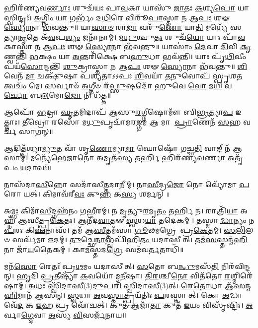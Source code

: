 𑌹𑌿𑌰᳴𑌣𑍍𑌯𑌵\-\ul{𑌰𑍍𑌣𑌾𑌃} 𑌶𑍁𑌚᳴𑌯𑌃 𑌪𑌾\-\ul{𑌵}\-𑌕𑌾 𑌯𑌾𑌸𑍁᳴ \ul{𑌜𑌾}\-𑌤𑌃 \ul{𑌕}\-𑌶𑍍𑌯\-\ul{𑌪𑍋} 𑌯𑌾𑌸𑍍𑌵𑌿𑌨𑍍𑌦𑍍𑌰𑌃᳴।
\-\ul{𑌅}\-𑌗𑍍𑌨𑌿𑌂 𑌯𑌾 𑌗𑌰𑍍𑌭𑌂᳴ 𑌦\-\ul{𑌧𑌿}\-𑌰𑍇 𑌵𑌿𑌰𑍂᳴\-\ul{𑌪𑌾}\-𑌸𑍍𑌤𑌾 \ul{𑌨} 𑌆\-\ul{𑌪𑌃} 𑌶𑍟 \ul{𑌸𑍍𑌯𑍋}\-𑌨𑌾 𑌭᳴𑌵𑌨𑍍𑌤𑍁॥ 
𑌯𑌾\-\ul{𑌸𑌾}\-\-\ul{𑍞} 𑌰𑌾\-\ul{𑌜𑌾} 𑌵𑌰𑍁᳴\-\ul{𑌣𑍋} 𑌯𑌾\-\ul{𑌤𑌿} 𑌮𑌧𑍍𑌯𑍇᳴ 𑌸𑌤𑍍𑌯𑌾\-\ul{𑌨𑍃}\-𑌤𑍇 𑌅᳴\-\ul{𑌵}\-𑌪\-\ul{𑌶𑍍𑌯𑌂} 𑌜𑌨𑌾᳴𑌨𑌾𑌮𑍍।
\-\ul{𑌮}\-\-\ul{𑌧𑍁}\-𑌶𑍍𑌚𑍁\-\ul{𑌤𑌃} 𑌶𑍁𑌚᳴\-\ul{𑌯𑍋} 𑌯𑌾𑌃 𑌪𑌾᳴\-\ul{𑌵}\-𑌕𑌾𑌸𑍍𑌤𑌾 \ul{𑌨} 𑌆\-\ul{𑌪𑌃} 𑌶𑍟 \ul{𑌸𑍍𑌯𑍋}\-𑌨𑌾 𑌭᳴𑌵𑌨𑍍𑌤𑍁॥ 
𑌯𑌾𑌸𑌾𑌂॑ \ul{𑌦𑍇}\-𑌵𑌾 \ul{𑌦𑌿}\-𑌵𑌿 \ul{𑌕𑍃}\-𑌣𑍍𑌵𑌨𑍍𑌤𑌿᳴ \ul{𑌭}\-𑌕𑍍𑌷𑌂 𑌯𑌾 \ul{𑌅}\-𑌨𑍍𑌤𑌰𑌿᳴𑌕𑍍𑌷𑍇 𑌬\-\ul{𑌹𑍁}\-𑌧𑌾 𑌭𑌵᳴𑌨𑍍𑌤𑌿।
𑌯𑌾𑌃 𑌪𑍃᳴\-\ul{𑌥𑌿}\-𑌵𑍀𑌂 𑌪𑌯᳴\-\ul{𑌸𑍋}\-𑌨𑍍𑌦𑌨𑍍𑌤𑌿᳴ \ul{𑌶𑍁}\-𑌕𑍍𑌰𑌾𑌸𑍍𑌤𑌾 \ul{𑌨} 𑌆\-\ul{𑌪𑌃} 𑌶𑍟 \ul{𑌸𑍍𑌯𑍋}\-𑌨𑌾 𑌭᳴𑌵𑌨𑍍𑌤𑍁॥ 
\-\ul{𑌶𑌿}\-𑌵𑍇𑌨᳴ \ul{𑌮𑌾} 𑌚𑌕𑍍𑌷𑍁᳴𑌷𑌾 𑌪𑌶𑍍𑌯𑌤𑌾𑌽𑌽𑌪𑌃 \ul{𑌶𑌿}\-𑌵𑌯𑌾᳴ \ul{𑌤}\-𑌨𑍁𑌵𑍋𑌪᳴ 𑌸𑍍𑌪𑍃𑌶\-\ul{𑌤} 𑌤𑍍𑌵𑌚𑌂᳴ 𑌮𑍇।
𑌸𑌰𑍍𑌵𑌾𑍞᳴ \ul{𑌅}\-𑌗𑍍𑌨𑍀𑍞 𑌰᳴\-\ul{𑌫𑍍𑌸𑍁}\-𑌷𑌦𑍋᳴ 𑌹𑍁𑌵𑍇 \ul{𑌵𑍋} 𑌮\-\ul{𑌯𑌿} 𑌵\-\ul{𑌰𑍍𑌚𑍋} 𑌬\-\ul{𑌲}\-𑌮𑍋\-\ul{𑌜𑍋} 𑌨𑌿 𑌧᳴𑌤𑍍𑌤॥

𑌆𑌪𑍋᳴ \ul{𑌭}\-𑌦𑍍𑌰𑌾 \ul{𑌘𑍃}\-𑌤𑌮𑌿𑌦𑌾𑌪᳴ 𑌆𑌸𑍁\-\ul{𑌰}\-𑌗𑍍𑌨𑍀𑌷𑍋𑌮𑍗᳴ 𑌬𑌿\-\ul{𑌭𑍍𑌰}\-𑌤𑍍𑌯𑌾\-\ul{𑌪} 𑌇𑌤𑍍𑌤𑌾𑌃।
\-\ul{𑌤𑍀}\-𑌵𑍍𑌰𑍋 𑌰𑌸𑍋᳴ 𑌮\-\ul{𑌧𑍁}\-𑌪𑍃𑌚𑌾᳴𑌮𑌰\-\ul{𑌙𑍍𑌗}\-𑌮 𑌆 𑌮𑌾 \ul{𑌪𑍍𑌰𑌾}\-𑌣𑍇𑌨᳴ \ul{𑌸}\-𑌹 𑌵𑌰𑍍𑌚᳴ 𑌸𑌾𑌗𑌨𑍍॥

𑌆𑌦𑌿𑌤𑍍𑌪᳴𑌶𑍍𑌯𑌾\-\ul{𑌮𑍍𑌯𑍁}\-𑌤 𑌵𑌾᳴ 𑌶𑍃\-\ul{𑌣𑍋}\-𑌮𑍍𑌯𑌾\-\ul{𑌮𑌾} 𑌘𑍋𑌷𑍋᳴ 𑌗𑌚𑍍𑌛\-\ul{𑌤𑌿} 𑌵𑌾𑌙𑍍 𑌨᳴ 𑌆𑌸𑌾𑌮𑍍।
𑌮𑌨𑍍𑌯𑍇᳴𑌭𑍇\-\ul{𑌜𑌾}\-𑌨𑍋 \ul{𑌅}\-𑌮𑍃𑌤᳴\-\ul{𑌸𑍍𑌯} 𑌤𑌰𑍍\mbox{}\-\ul{𑌹𑌿} 𑌹𑌿𑌰᳴𑌣𑍍𑌯𑌵\-\ul{𑌰𑍍𑌣𑌾} 𑌅𑌤𑍃᳴𑌪𑌂 \ul{𑌯}\-𑌦𑌾𑌵𑌃᳴॥


𑌨𑌾𑌸᳴𑌦𑌾\-\ul{𑌸𑍀}\-𑌨𑍍𑌨𑍋 𑌸𑌦𑌾᳴𑌸𑍀\-\ul{𑌤𑍍𑌤}\-𑌦𑌾𑌨𑍀𑌮𑍍।
𑌨𑌾\-\ul{𑌸𑍀}\-𑌦𑍍𑌰\-\ul{𑌜𑍋} 𑌨𑍋 𑌵𑍍𑌯𑍋᳴𑌮𑌾 \ul{𑌪}\-𑌰𑍋 𑌯𑌤𑍍।
𑌕𑌿𑌮𑌾𑌵᳴𑌰𑍀\-\ul{𑌵𑌃} 𑌕𑍁\-\ul{𑌹} 𑌕\-\ul{𑌸𑍍𑌯} 𑌶𑌰𑍍𑌮𑌨𑍍॥

𑌅\-\ul{𑌮𑍍𑌭𑌃} 𑌕𑌿𑌮𑌾᳴\-\ul{𑌸𑍀}\-𑌦𑍍𑌗𑌹᳴𑌨𑌂 𑌗\-\ul{𑌭𑍀}\-𑌰𑌮𑍍।
𑌨 \ul{𑌮𑍃}\-𑌤𑍍𑌯𑍁\-\ul{𑌰}\-𑌮𑍃\-\ul{𑌤𑌂} 𑌤𑌰𑍍\mbox{}\-\ul{𑌹𑌿} 𑌨।
𑌰𑌾𑌤𑍍𑌰𑌿᳴\-\ul{𑌯𑌾} 𑌅𑌹𑍍𑌨᳴ 𑌆𑌸𑍀𑌤𑍍𑌪𑍍𑌰\-\ul{𑌕𑍇}\-𑌤𑌃।
𑌆𑌨𑍀᳴𑌦\-\ul{𑌵𑌾}\-𑌤𑍟 \ul{𑌸𑍍𑌵}\-𑌧\-\ul{𑌯𑌾} 𑌤𑌦𑍇𑌕𑌮𑍍।
𑌤𑌸𑍍𑌮𑌾\-\ul{𑌦𑍍𑌧𑌾}\-𑌨𑍍𑌯𑌂 𑌨 \ul{𑌪}\-𑌰𑌃 𑌕𑌿\-\ul{𑌞𑍍𑌚}\-𑌨𑌾𑌸᳴।
𑌤𑌮᳴ 𑌆\-\ul{𑌸𑍀}\-𑌤𑍍𑌤𑌮᳴𑌸𑌾 \ul{𑌗𑍂}\-𑌢𑌮𑌗𑍍𑌰𑍇 𑌪𑍍𑌰\-\ul{𑌕𑍇}\-𑌤𑌮𑍍।
\-\ul{𑌸}\-\-\ul{𑌲𑌿}\-𑌲𑍞 𑌸𑌰𑍍𑌵᳴𑌮𑌾 \ul{𑌇}\-𑌦𑌮𑍍।
\-\ul{𑌤𑍁}\-𑌚𑍍𑌛𑍇\-\ul{𑌨𑌾}\-𑌭𑍍𑌵𑌪𑌿᳴𑌹𑌿\-\ul{𑌤𑌂} 𑌯𑌦𑌾𑌸𑍀𑌤𑍍।
𑌤𑌮᳴\-\ul{𑌸}\-𑌸𑍍𑌤𑌨𑍍𑌮᳴\-\ul{𑌹𑌿}\-𑌨𑌾 𑌜𑌾᳴\-\ul{𑌯}\-𑌤𑍈𑌕𑌮𑍍।
𑌕𑌾\-\ul{𑌮}\-𑌸𑍍𑌤𑌦\-\ul{𑌗𑍍𑌰𑍇} 𑌸𑌮᳴𑌵\-\ul{𑌰𑍍𑌤}\-𑌤𑌾𑌧𑌿᳴॥

𑌮𑌨᳴\-\ul{𑌸𑍋} 𑌰𑍇𑌤𑌃᳴ 𑌪𑍍𑌰\-\ul{𑌥}\-𑌮𑌂 𑌯𑌦𑌾𑌸𑍀𑌤𑍍।
\-\ul{𑌸}\-𑌤𑍋 𑌬\-\ul{𑌨𑍍𑌧𑍁}\-𑌮𑌸᳴\-\ul{𑌤𑌿} 𑌨𑌿𑌰᳴𑌵𑌿𑌨𑍍𑌦𑌨𑍍।
\-\ul{𑌹𑍃}\-𑌦𑌿 \ul{𑌪𑍍𑌰}\-𑌤𑍀𑌷𑍍𑌯𑌾᳴ \ul{𑌕}\-𑌵𑌯𑍋᳴ 𑌮\-\ul{𑌨𑍀}\-𑌷𑌾।
\-\ul{𑌤𑌿}\-\-\ul{𑌰}\-𑌶𑍍𑌚𑍀\-\ul{𑌨𑍋} 𑌵𑌿𑌤᳴𑌤𑍋 \ul{𑌰}\-𑌶𑍍𑌮𑌿𑌰𑍇᳴𑌷𑌾𑌮𑍍।
\-\ul{𑌅}\-𑌧𑌃 𑌸𑍍𑌵𑌿᳴\-\ul{𑌦𑌾}\-𑌸𑍀(3)\-\ul{𑌦𑍁}\-𑌪𑌰𑌿᳴ 𑌸𑍍𑌵𑌿𑌦𑌾𑌸𑍀(3)𑌤𑍍।
\-\ul{𑌰𑍇}\-\-\ul{𑌤𑍋}\-𑌧𑌾 𑌆᳴𑌸𑌨𑍍𑌮\-\ul{𑌹𑌿}\-𑌮𑌾𑌨᳴ 𑌆𑌸𑌨𑍍।
\-\ul{𑌸𑍍𑌵}\-𑌧𑌾 \ul{𑌅}\-𑌵\-\ul{𑌸𑍍𑌤𑌾}\-𑌤𑍍𑌪𑍍𑌰𑌯᳴𑌤𑌿𑌃 \ul{𑌪}\-𑌰𑌸𑍍𑌤𑌾𑌤𑍍।
𑌕𑍋 \ul{𑌅}\-𑌦𑍍𑌧𑌾 𑌵𑍇᳴\-\ul{𑌦} 𑌕 \ul{𑌇}\-𑌹 𑌪𑍍𑌰 𑌵𑍋᳴𑌚𑌤𑍍।
𑌕𑍁\-\ul{𑌤} 𑌆𑌜𑌾᳴\-\ul{𑌤𑌾} 𑌕𑍁𑌤᳴ \ul{𑌇}\-𑌯𑌂 𑌵𑌿𑌸𑍃᳴𑌷𑍍𑌟𑌿𑌃।
\-\ul{𑌅}\-𑌰𑍍𑌵𑌾\-\ul{𑌗𑍍𑌦𑍇}\-𑌵𑌾 \ul{𑌅}\-𑌸𑍍𑌯 \ul{𑌵𑌿}\-𑌸𑌰𑍍𑌜᳴𑌨𑌾𑌯॥

